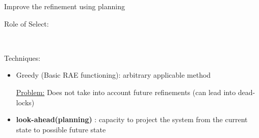 \begin{frame}{Improve the refinement using planning}
    \begin{center}
        
    Role of Select:

    ~

    


    \end{center}

    Techniques:
    \begin{itemize}

    \item Greedy (Basic RAE functioning): arbitrary applicable method
    \pause
    
    \underline{Problem:} Does not take into account future refinements (can lead into dead-locks)
    \pause
    \item \textbf{look-ahead(planning)} : capacity to project the system from the current state to possible future state

    \end{itemize}
\end{frame}
